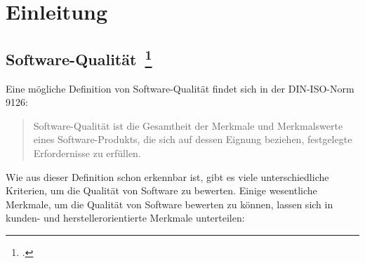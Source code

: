\chapter{Einleitung}

\section[Software-Qualität]{Software-Qualität~\footcite[vgl.][Kapitel 1.2]{hoffmann_software-qualitat_2013}}

Eine mögliche Definition von Software-Qualität findet sich in der DIN-ISO-Norm 9126:

\begin{quote}
  Software-Qualität ist die Gesamtheit der Merkmale und Merkmalswerte eines Software-Produkts, die sich auf dessen Eignung beziehen, festgelegte Erfordernisse zu erfüllen.
\end{quote}

Wie aus dieser Definition schon erkennbar ist, gibt es viele unterschiedliche Kriterien, um die Qualität von Software zu bewerten.
Einige wesentliche Merkmale, um die Qualität von Software bewerten zu können, lassen sich in kunden- und herstellerorientierte Merkmale unterteilen:

